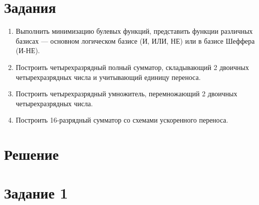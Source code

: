\documentclass[oneside,a4paper,14pt]{extarticle}
\begin{document}
\section*{Задания}
\begin{enumerate}
	\item
	      Выполнить минимизацию булевых функций, представить функции
	      различных базисах --- основном логическом базисе (И, ИЛИ, НЕ) или в
	      базисе Шеффера (И-НЕ).
	\item
	      Построить четырехразрядный полный сумматор, складывающий 2
	      двоичных четырехразрядных числа и учитывающий единицу переноса.
	\item
	      Построить четырехразрядный умножитель, перемножающий 2 двоичных
	      четырехразрядных числа.
	\item
	      Построить 16-разрядный сумматор со схемами ускоренного переноса.
\end{enumerate}
\newpage

\section*{Решение}

\section*{Задание 1}
\end{document}
